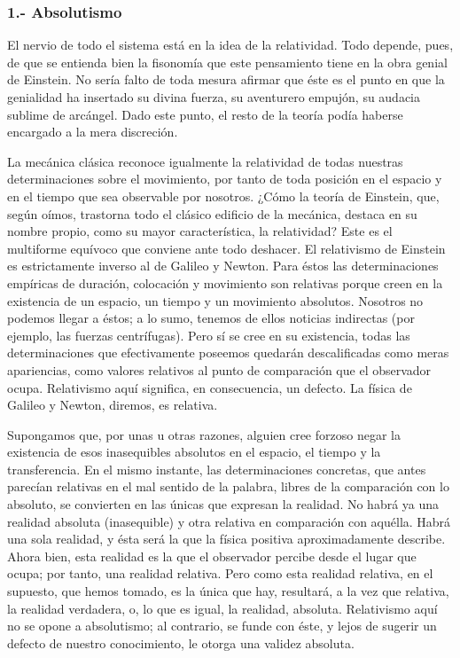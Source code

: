 \documentclass[a4paper, 12pt]{article}
\begin{document}
\subsubsection*{1.- Absolutismo}

El nervio de todo el sistema está en la idea de la relatividad. Todo
depende, pues, de que se entienda bien la fisonomía que este pensamiento
tiene en la obra genial de Einstein. No sería falto de toda mesura afirmar
que éste es el punto en que la genialidad ha insertado su divina fuerza,
su aventurero empujón, su audacia sublime de arcángel. Dado este punto, el
resto de la teoría podía haberse encargado a la mera discreción.

La mecánica clásica reconoce igualmente la relatividad de todas nuestras
determinaciones sobre el movimiento, por tanto de toda posición en el
espacio y en el tiempo que sea observable por nosotros. ¿Cómo la teoría
de Einstein, que, según oímos, trastorna todo el clásico edificio de la
mecánica, destaca en su nombre propio, como su mayor característica, la
relatividad? Este es el multiforme equívoco que conviene ante todo
deshacer. El relativismo de Einstein es estrictamente inverso al de
Galileo y Newton. Para éstos las determinaciones empíricas de duración,
colocación y movimiento son relativas porque creen en la existencia de un
espacio, un tiempo y un movimiento absolutos. Nosotros no podemos llegar a
éstos; a lo sumo, tenemos de ellos noticias indirectas (por ejemplo, las
fuerzas centrífugas). Pero sí se cree en su existencia, todas las
determinaciones que efectivamente poseemos quedarán descalificadas como
meras apariencias, como valores relativos al punto de comparación que el
observador ocupa. Relativismo aquí significa, en consecuencia, un defecto.
La física de Galileo y Newton, diremos, es relativa.

Supongamos que, por unas u otras razones, alguien cree forzoso negar la
existencia de esos inasequibles absolutos en el espacio, el tiempo y la
transferencia. En el mismo instante, las determinaciones concretas, que
antes parecían relativas en el mal sentido de la palabra, libres de la
comparación con lo absoluto, se convierten en las únicas que expresan la
realidad. No habrá ya una realidad absoluta (inasequible) y otra relativa
en comparación con aquélla. Habrá una sola realidad, y ésta será la que la
física positiva aproximadamente describe. Ahora bien, esta realidad es la
que el observador percibe desde el lugar que ocupa; por tanto, una
realidad relativa. Pero como esta realidad relativa, en el supuesto, que
hemos tomado, es la única que hay, resultará, a la vez que relativa, la
realidad verdadera, o, lo que es igual, la realidad, absoluta. Relativismo
aquí no se opone a absolutismo; al contrario, se funde con éste, y lejos
de sugerir un defecto de nuestro conocimiento, le otorga una validez
absoluta.
\end{document}

